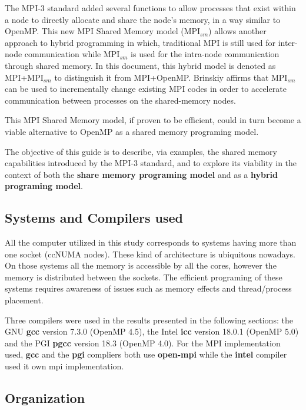 \medskip

The MPI-3 standard added several functions to allow processes that exist within a node to directly allocate and share the node's memory, in a way similar to OpenMP. This new MPI Shared Memory model (MPI$_{sm}$) allows another approach to hybrid programming in which, traditional MPI is still used for inter-node communication while MPI$_{sm}$ is used for the intra-node communication through shared memory. In this document, this hybrid model is denoted as MPI+MPI$_{sm}$ to distinguish it from MPI+OpenMP. Brinskiy\cite{brinskiy2015} affirms that MPI$_{sm}$ can be used to incrementally change existing MPI codes in order to accelerate communication between processes on the shared-memory nodes.

\medskip

This MPI Shared Memory model, if proven to be efficient, could in turn become a viable alternative to OpenMP as a shared memory programing model.
 
\medskip

The objective of this guide is to describe, via examples, the shared memory capabilities introduced by the MPI-3 standard, and to explore its viability in the context of both the \textbf{share memory programing model} and as a \textbf{hybrid programing model}.


\subsection*{Systems and Compilers used}

All the computer utilized in this study corresponds to systems having more than one socket (ccNUMA nodes). These kind of architecture is ubiquitous nowadays. On those systems all the memory is accessible by all the cores, however the memory is distributed between the sockets. The efficient programing of these systems requires awareness of issues such as memory effects and thread/process placement.


Three compilers were used in the results presented in the following sections: the GNU \textbf{gcc}  version 7.3.0 (OpenMP 4.5), the Intel \textbf{icc} version 18.0.1 (OpenMP 5.0) and the  PGI \textbf{pgcc} version 18.3 (OpenMP 4.0). For the MPI implementation used, \textbf{gcc} and the \textbf{pgi} compliers both use \textbf{open-mpi} while the \textbf{intel} compiler used it own mpi implementation.



\subsection*{Organization}


